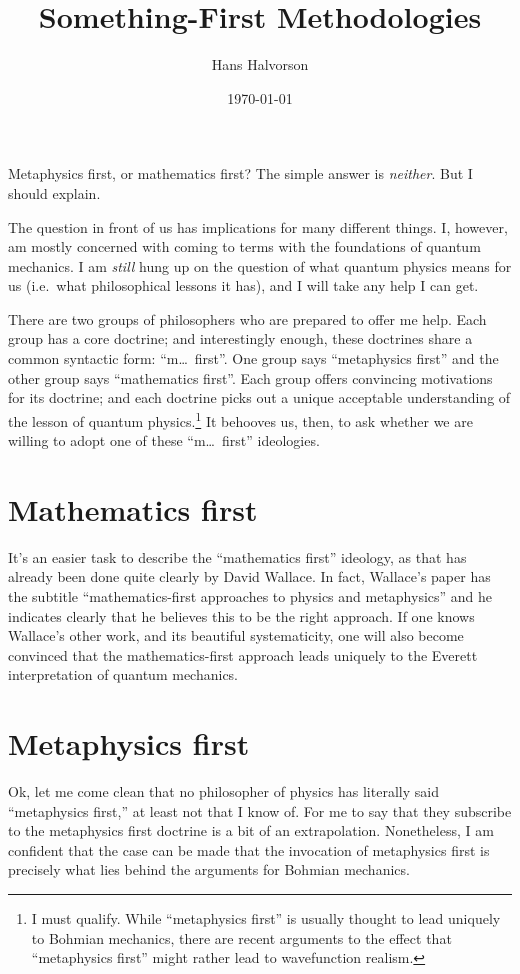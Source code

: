 \documentclass[12pt]{article}
\title{Something-First Methodologies}
\author{Hans Halvorson}
\date{\today}
\begin{document}
\maketitle

Metaphysics first, or mathematics first? The simple answer is
\emph{neither}. But I should explain.

The question in front of us has implications for many different
things. I, however, am mostly concerned with coming to terms with the
foundations of quantum mechanics. I am \emph{still} hung up on the
question of what quantum physics means for us (i.e.\ what
philosophical lessons it has), and I will take any help I can get.

There are two groups of philosophers who are prepared to offer me
help. Each group has a core doctrine; and interestingly enough, these
doctrines share a common syntactic form: ``m\dots\ first''. One group
says ``metaphysics first'' and the other group says ``mathematics
first''. Each group offers convincing motivations for its doctrine;
and each doctrine picks out a unique acceptable understanding of the
lesson of quantum physics.\footnote{I must qualify. While
  ``metaphysics first'' is usually thought to lead uniquely to Bohmian
  mechanics, there are recent arguments to the effect that
  ``metaphysics first'' might rather lead to wavefunction realism.} It
behooves us, then, to ask whether we are willing to adopt one of these
``m\dots\ first'' ideologies.

\section{Mathematics first}

It's an easier task to describe the ``mathematics first'' ideology, as
that has already been done quite clearly by David Wallace. In fact,
Wallace's paper has the subtitle ``mathematics-first approaches to
physics and metaphysics'' and he indicates clearly that he believes
this to be the right approach. If one knows Wallace's other work, and
its beautiful systematicity, one will also become convinced that the
mathematics-first approach leads uniquely to the Everett
interpretation of quantum mechanics.

\section{Metaphysics first}



Ok, let me come clean that no philosopher of physics has literally
said ``metaphysics first,'' at least not that I know of. For me to say
that they subscribe to the metaphysics first doctrine is a bit of an
extrapolation. Nonetheless, I am confident that the case can be made
that the invocation of metaphysics first is precisely what lies behind
the arguments for Bohmian mechanics.
\end{document}
